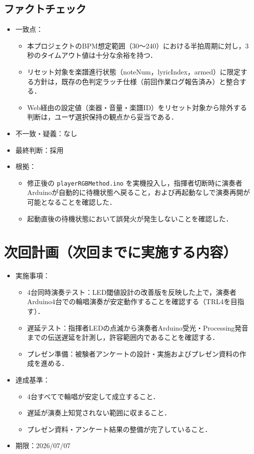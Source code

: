 \documentclass[lualatex,paper=a4paper,jafontsize=11.5pt,jafontscale=1.05]{jlreq}
\begin{document}
\subsection{ファクトチェック}
\begin{itemize}
  \item 一致点：
  \begin{itemize}
    \item 本プロジェクトのBPM想定範囲（30〜240）における半拍周期に対し，3秒のタイムアウト値は十分な余裕を持つ．
    \item リセット対象を楽譜進行状態（noteNum，lyricIndex，armed）に限定する方針は，既存の色判定ラッチ仕様（前回作業ログ報告済み）と整合する．
    \item Web経由の設定値（楽器・音量・楽譜ID）をリセット対象から除外する判断は，ユーザ選択保持の観点から妥当である．
  \end{itemize}
  \item 不一致・疑義：なし
  \item 最終判断：採用
  \item 根拠：
  \begin{itemize}
    \item 修正後の \texttt{playerRGBMethod.ino} を実機投入し，指揮者切断時に演奏者Arduinoが自動的に待機状態へ戻ること，および再起動なしで演奏再開が可能となることを確認した．
    \item 起動直後の待機状態において誤発火が発生しないことを確認した．
  \end{itemize}
\end{itemize}

\section{次回計画（次回までに実施する内容）}
\begin{itemize}
  \item 実施事項：
  \begin{itemize}
    \item 4台同時演奏テスト：LED閾値設計の改善版を反映した上で，演奏者Arduino4台での輪唱演奏が安定動作することを確認する（TRL4を目指す）．
    \item 遅延テスト：指揮者LEDの点滅から演奏者Arduino受光・Processing発音までの伝送遅延を計測し，許容範囲内であることを確認する．
    \item プレゼン準備：被験者アンケートの設計・実施およびプレゼン資料の作成を進める．
  \end{itemize}
  \item 達成基準：
  \begin{itemize}
    \item 4台すべてで輪唱が安定して成立すること．
    \item 遅延が演奏上知覚されない範囲に収まること．
    \item プレゼン資料・アンケート結果の整備が完了していること．
  \end{itemize}
  \item 期限：2026/07/07
\end{itemize}
\end{document}
